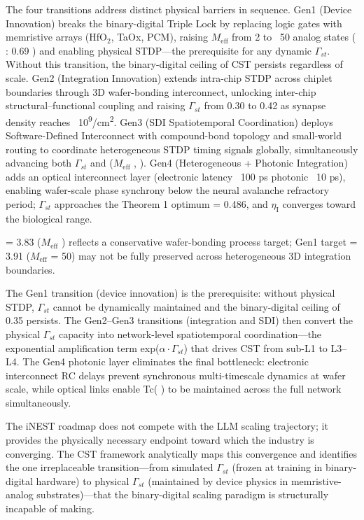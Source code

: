 \documentclass[a4paper,12pt]{article}
\providecommand{\textsubscript}[1]{\ensuremath{_{\text{#1}}}}
\begin{document}
The four transitions address distinct physical barriers in sequence.
Gen1 (Device Innovation) breaks the binary-digital Triple Lock by replacing logic gates with memristive arrays (HfO\textsubscript{2}, TaOx, PCM), raising $M_{\text{eff}}$ from 2 to ~50 analog states ( \alpha : 0.69 ) and enabling physical STDP---the prerequisite for any dynamic $\Gamma_{st}$.
Without this transition, the binary-digital ceiling of CST   persists regardless of scale.
Gen2 (Integration Innovation) extends intra-chip STDP across chiplet boundaries through 3D wafer-bonding interconnect, unlocking inter-chip structural--functional coupling and raising $\Gamma_{st}$ from 0.30 to 0.42 as synapse density reaches ~10\textsuperscript{9}/cm\textsuperscript{2}.
Gen3 (SDI Spatiotemporal Coordination) deploys Software-Defined Interconnect with compound-bond topology and small-world routing to coordinate heterogeneous STDP timing signals globally, simultaneously advancing both $\Gamma_{st}$ and  \alpha  ($M_{\text{eff}}$  ,  \alpha   {}).
Gen4 (Heterogeneous + Photonic Integration) adds an optical interconnect layer (electronic latency ~100 ps  \rightarrow  photonic ~10 ps), enabling wafer-scale phase synchrony  \Phi  below the neural avalanche refractory period; $\Gamma_{st}$ approaches the Theorem 1 optimum  \gamma * = 0.486, and $\eta_{\text{I}}$ converges toward the biological range.

  \alpha  = 3.83 ($M_{\text{eff}}$  ) reflects a conservative wafer-bonding process target; Gen1 target  \alpha  = 3.91 ($M_{\text{eff}}$ = 50) may not be fully preserved across heterogeneous 3D integration boundaries.

The Gen1 transition (device innovation) is the prerequisite: without physical STDP, $\Gamma_{st}$ cannot be dynamically maintained and the binary-digital ceiling of 0.35 persists.
The Gen2--Gen3 transitions (integration and SDI) then convert the physical $\Gamma_{st}$ capacity into network-level spatiotemporal coordination---the exponential amplification term exp($\alpha \cdot \Gamma_{st}$) that drives CST from sub-L1 to L3--L4.
The Gen4 photonic layer eliminates the final bottleneck: electronic interconnect RC delays prevent synchronous multi-timescale dynamics at wafer scale, while optical links enable Tc( \Phi ) to be maintained across the full network simultaneously.

The iNEST roadmap does not compete with the LLM scaling trajectory; it provides the physically necessary endpoint toward which the industry is converging.
The CST framework analytically maps this convergence and identifies the one irreplaceable transition---from simulated $\Gamma_{st}$ (frozen at training in binary-digital hardware) to physical $\Gamma_{st}$ (maintained by device physics in memristive-analog substrates)---that the binary-digital scaling paradigm is structurally incapable of making.
\end{document}
